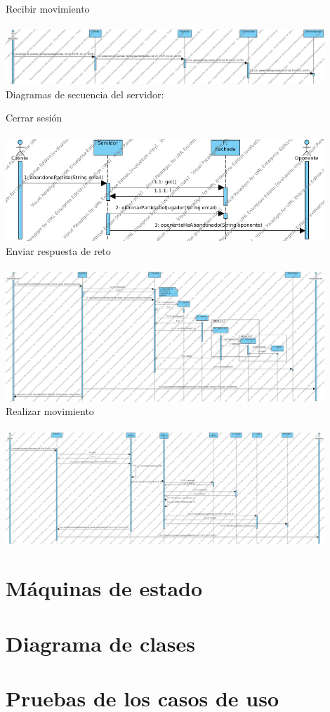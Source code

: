 \documentclass[a4paper,11pt,oneside]{article}
\begin{document}
Recibir movimiento
\\ \\
\includegraphics[width=0.9\textwidth]{img/ds_RecibirMovimientoCliente.png}\\[1cm]


Diagramas de secuencia del servidor:

Cerrar sesión
\\ \\
\includegraphics[width=0.9\textwidth]{img/ds_CerrarSesionServidor.png}\\[1cm]

Enviar respuesta de reto
\\ \\
\includegraphics[width=0.9\textwidth]{img/ds_EnviarRespuestaRetoServidor.png}\\[1cm]

Realizar movimiento
\\ \\
\includegraphics[width=0.9\textwidth]{img/ds_RealizarMovimientoServidor.png}\\[1cm]



\section{Máquinas de estado}

\section{Diagrama de clases}

\section{Pruebas de los casos de uso}
\end{document}
